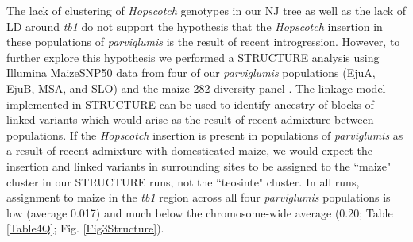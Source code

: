 \documentclass[11pt]{article} %
\begin{document}
\begin{linenumbers}
\begin{flushleft}
The lack of clustering of \emph{Hopscotch} genotypes in our NJ tree as well as the lack of LD around \emph{tb1} do not support the hypothesis that the \emph{Hopscotch} insertion in these populations of \emph{parviglumis} is the result of recent introgression. However, to further explore this hypothesis we performed a STRUCTURE analysis using Illumina MaizeSNP50 data from four of our \emph{parviglumis} populations (EjuA, EjuB, MSA, and SLO) \citep{Pyhajarvi2013} and the maize 282 diversity panel \citep{Cook2012}. 
The linkage model implemented in STRUCTURE can be used to identify ancestry of blocks of linked variants which would arise as the result of recent admixture between populations. If the \emph{Hopscotch} insertion is present in populations of \emph{parviglumis} as a result of recent admixture with domesticated maize, we would expect the insertion and linked variants in surrounding sites to be assigned to the ``maize" cluster in our STRUCTURE runs, not the ``teosinte" cluster. In all runs, assignment to maize in the \emph{tb1} region across all four \emph{parviglumis} populations is low (average 0.017) and much below the chromosome-wide average (0.20; Table \ref{Table4Q}; Fig. \ref{Fig3Structure}). 


\end{flushleft}
\end{linenumbers}
\end{document}
